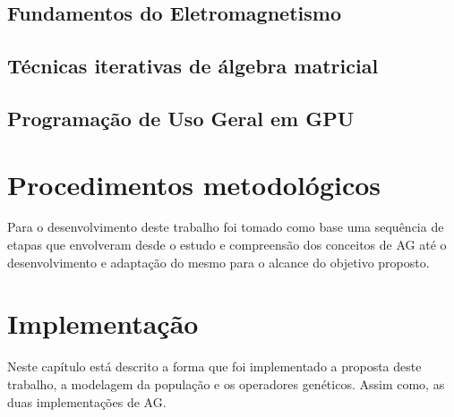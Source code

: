 \documentclass[
    12pt,               %
    openright,          %
    oneside,
    a4paper,            %
    english,            %
    french,             %
    spanish,            %
    brazil              %
    ]{abntex2}
\begin{document}
\section{Fundamentos do Eletromagnetismo}
\label{sec:eletromag}


\section{Técnicas iterativas de álgebra matricial}
\label{sec:tecItera}



\section{Programação de Uso Geral em GPU}
\label{sec:GPGPU}




\chapter{Procedimentos metodológicos}
Para o desenvolvimento deste trabalho foi tomado como base uma sequência de etapas que envolveram desde o estudo e compreensão dos conceitos de AG até o desenvolvimento e adaptação do mesmo para o alcance do objetivo proposto.


\chapter{Implementação}
\label{chap:implementacao}

Neste capítulo está descrito a forma que foi implementado a proposta deste trabalho, a modelagem da população e os operadores genéticos. Assim como, as duas implementações de AG.
\end{document}
